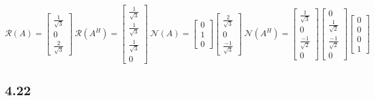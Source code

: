 \documentclass[letterpaper,12pt]{article}
\theoremstyle{definition}
\begin{document}
        $\mathcal{R}(A) = \begin{bmatrix} \frac{1}{\sqrt{3}}\\0\\
            \frac{2}{\sqrt{3}}\end{bmatrix}~ \mathcal{R}(A^H) = \begin{bmatrix}
            \frac{1}{\sqrt{3}}\\ \frac{1}{\sqrt{3}} \\ \frac{1}{\sqrt{3}}\\0
        \end{bmatrix}~  \mathcal{N}(A)= \begin{bmatrix} 0\\1\\0 \end{bmatrix}
        \begin{bmatrix} \frac{2}{\sqrt{3}}\\0\\ \frac{-1}{\sqrt{3}}
        \end{bmatrix}~ \mathcal{N}(A^H) = \begin{bmatrix} \frac{1}{\sqrt{3}} \\
            0 \\ \frac{-1}{\sqrt{2}} \\ 0 \end{bmatrix}
        \begin{bmatrix} 0\\ \frac{1}{\sqrt{2}}\\ \frac{-1}{\sqrt{2}}\\0
        \end{bmatrix}
        \begin{bmatrix} 0 \\ 0 \\ 0 \\ 1 \end{bmatrix}$



\subsection*{4.22}
\end{document}
